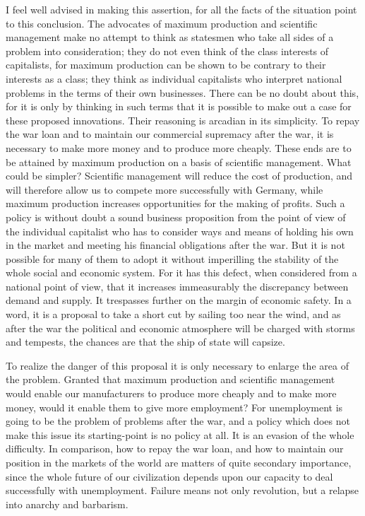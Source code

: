 \documentclass{book}
\begin{document}
I feel well advised in making this assertion, for all the facts of the situation point to this conclusion. The advocates of maximum production and scientific management make no attempt to think as statesmen who take all sides of a problem into consideration; they do not even think of the class interests of capitalists, for maximum production can be shown to be contrary to their interests as a class; they think as individual capitalists who interpret national problems in the terms of their own businesses. There can be no doubt about this, for it is only by thinking in such terms that it is possible to make out a case for these proposed innovations. Their reasoning is arcadian in its simplicity. To repay the war loan and to maintain our commercial supremacy after the war, it is necessary to make more money and to produce more cheaply. These ends are to be attained by maximum production on a basis of scientific management. What could be simpler? Scientific management will reduce the cost of production, and will therefore allow us to compete more successfully with Germany, while maximum production increases opportunities for the making of profits. Such a policy is without doubt a sound business proposition from the point of view of the individual capitalist who has to consider ways and means of holding his own in the market and meeting his financial obligations after the war. But it is not possible for many of them to adopt it without imperilling the stability of the whole social and economic system. For it has this defect, when considered from a national point of view, that it increases immeasurably the discrepancy between demand and supply. It trespasses further on the margin of economic safety. In a word, it is a proposal to take a short cut by sailing too near the wind, and as after the war the political and economic atmosphere will be charged with storms and tempests, the chances are that the ship of state will capsize.

To realize the danger of this proposal it is only necessary to enlarge the area of the problem. Granted that maximum production and scientific management would enable our manufacturers to produce more cheaply and to make more money, would it enable them to give more employment? For unemployment is going to be the problem of problems after the war, and a policy which does not make this issue its starting-point is no policy at all. It is an evasion of the whole difficulty. In comparison, how to repay the war loan, and how to maintain our position in the markets of the world are matters of quite secondary importance, since the whole future of our civilization depends upon our capacity to deal successfully with unemployment. Failure means not only revolution, but a relapse into anarchy and barbarism.
\end{document}

